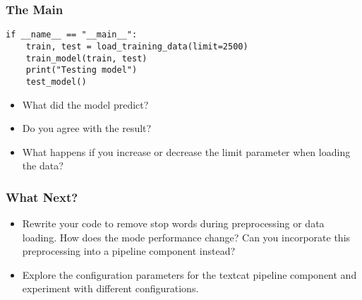 \begin{frame}[fragile]\frametitle{The Main}

\begin{lstlisting}
if __name__ == "__main__":
    train, test = load_training_data(limit=2500)
    train_model(train, test)
    print("Testing model")
    test_model()
\end{lstlisting}

\begin{itemize}
\item What did the model predict? 
\item Do you agree with the result? 
\item What happens if you increase or decrease the limit parameter when loading the data? 
\end{itemize}

\end{frame}


\begin{frame}[fragile]\frametitle{What Next?}

\begin{itemize}
\item Rewrite your code to remove stop words during preprocessing or data loading. How does the mode performance change? Can you incorporate this preprocessing into a pipeline component instead?
\item Explore the configuration parameters for the textcat pipeline component and experiment with different configurations.
\end{itemize}

\end{frame}






